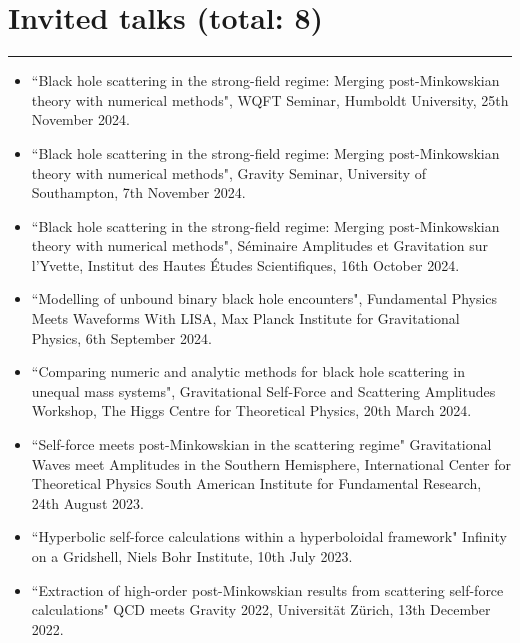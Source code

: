 \documentclass[10.5pt, oneside]{article}   	%
\begin{document}



 
  {\color{Sectioncolour}
\section*{Invited talks {\rm (total: 8)}}
\vspace{-3mm}
\noindent\rule{\linewidth}{0.6pt}}
\begin{itemize}
\item ``Black hole scattering in the strong-field regime: Merging post-Minkowskian theory with numerical methods", WQFT Seminar, Humboldt University, 25th November 2024.
\item ``Black hole scattering in the strong-field regime: Merging post-Minkowskian theory with numerical methods", Gravity Seminar, University of Southampton, 7th November 2024.
\item ``Black hole scattering in the strong-field regime: Merging post-Minkowskian theory with numerical methods", Séminaire Amplitudes et Gravitation sur l'Yvette, Institut des Hautes Études Scientifiques, 16th October 2024.
\item ``Modelling of unbound binary black hole encounters", Fundamental Physics Meets Waveforms With LISA, Max Planck Institute for Gravitational Physics, 6th September 2024.
\item ``Comparing numeric and analytic methods for black hole scattering in unequal mass systems", Gravitational Self-Force and Scattering Amplitudes Workshop, The Higgs Centre for Theoretical Physics, 20th March 2024.
\item ``Self-force meets post-Minkowskian in the scattering regime" Gravitational Waves meet Amplitudes in the Southern Hemisphere, International Center for Theoretical Physics South American Institute for Fundamental Research, 24th August 2023.
\item``Hyperbolic self-force calculations within a hyperboloidal framework" Infinity on a Gridshell, Niels Bohr Institute, 10th July 2023.
\item ``Extraction of high-order post-Minkowskian results from scattering self-force calculations" QCD meets Gravity 2022, Universität Zürich, 13th December 2022.
\end{itemize} 
 
\end{document}
